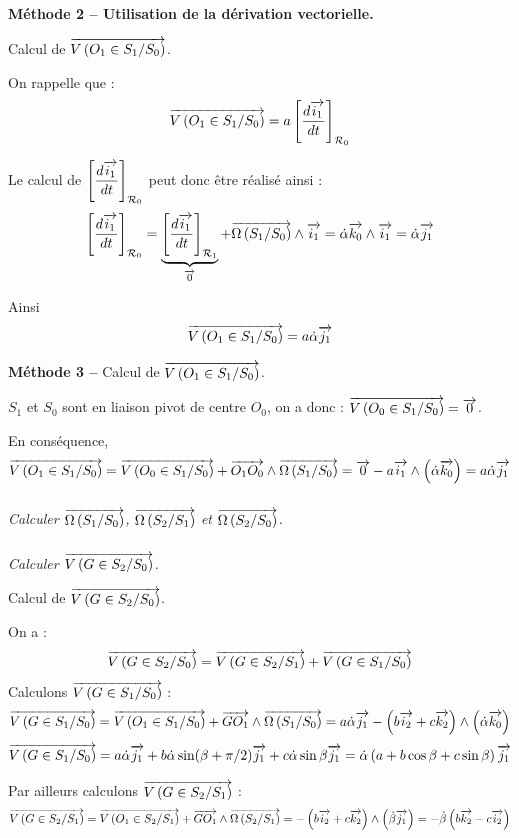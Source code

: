 \documentclass[10pt,fleqn]{article} %
\begin{document}
\begin{multicols}{2}
\begin{corrige}
\textbf{Méthode 2 -- Utilisation de la dérivation vectorielle.}

Calcul de $\vectv{O_1}{S_1}{S_0}$.

On rappelle que :
$$
\vectv{O_1}{S_1}{S_0} 
= a \left[\dfrac{d  \vect{i_1} }{dt}\right]_{\mathcal{R}_0}
$$

Le calcul de $\left[\dfrac{d  \vect{i_1} }{dt}\right]_{\mathcal{R}_0}$ peut donc être réalisé ainsi : 
$$ 
\left[\dfrac{d  \vect{i_1} }{dt}\right]_{\mathcal{R}_0} = 
\underbrace{\left[\dfrac{d  \vect{i_1} }{dt}\right]_{\mathcal{R}_1}}_{\vect{0}} + \vecto{S_1}{S_0}\wedge \vect{i_1}
=\dot{\alpha}\vect{k_0}  \wedge \vect{i_1}
=\dot{\alpha} \vect{j_1}
$$

Ainsi 
$$
\vectv{O_1}{S_1}{S_0} 
= a \dot{\alpha} \vect{j_1}
$$

\textbf{Méthode 3 -- }
Calcul de $\vectv{O_1}{S_1}{S_0}$.

$S_1$ et $S_0$ sont en liaison pivot de centre $O_0$, on a donc :  $\vectv{O_0}{S_1}{S_0}=\vect{0}$.

En conséquence, 
$$
\vectv{O_1}{S_1}{S_0} = \vectv{O_0}{S_1}{S_0} + \vect{O_1O_0}\wedge   \vecto{S_1}{S_0} = \vect{0} - a \vect{i_1} \wedge \left( \dot{\alpha}\vect{k_0} \right)
=a \dot{\alpha}\vect{j_1}
$$

\end{corrige}\else \fi


\subparagraph{}
\textit{Calculer $\vecto{S_1}{S_0}$, $\vecto{S_2}{S_1}$ et $\vecto{S_2}{S_0}$.}



\subparagraph{}
\textit{Calculer $\vectv{G}{S_2}{S_0}$.}
\ifprof
\begin{corrige}

Calcul de $\vectv{G}{S_2}{S_0}$.

On a : 
$$\vectv{G}{S_2}{S_0} = \vectv{G}{S_2}{S_1} + \vectv{G}{S_1}{S_0} $$
Calculons $\vectv{G}{S_1}{S_0}$ :
$$
\vectv{G}{S_1}{S_0} 
= \vectv{O_1}{S_1}{S_0} + \vect{GO_1}\wedge\vecto{S_1}{S_0}
= a\dot{\alpha}\vect{j_1} - \left(b\vect{i_2} + c\vect{k_2}\right) \wedge\left( \dot{\alpha} \vect{k_0}\right)
$$
$$
\vectv{G}{S_1}{S_0} 
= a\dot{\alpha}\vect{j_1}  + b\dot{\alpha} \sin(\beta+\pi/2) \vect{j_1} + c \dot{\alpha}\sin\beta\vect{j_1}
= \dot{\alpha} \left(a+b \cos\beta + c \sin\beta\right) \vect{j_1} 
$$

Par ailleurs calculons $\vectv{G}{S_2}{S_1}$ :
$$\vectv{G}{S_2}{S_1} = \vectv{O_1}{S_2}{S_1} + \vect{GO_1}\wedge \vecto{S_2}{S_1}
=-\left(b\vect{i_2}+c\vect{k_2}\right) \wedge \left(\dot{\beta}\vect{j_1}\right)
=-\dot{\beta}\left(b\vect{k_2}-c\vect{i_2} \right)
$$


\end{corrige}
\end{multicols}
\end{document}
